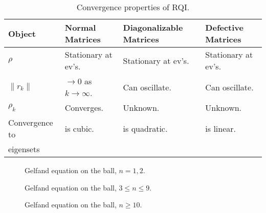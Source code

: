 \begin{table}[t]
\caption{Convergence properties of RQI.\label{pde.tab2}}
\centering
\plusline\small
\begin{tabular}{l|lll} \hline
Object & Normal Matrices & Diagonalizable Matrices
& Defective Matrices \\ \hline
$\rho$ & Stationary at ev's. &
Stationary at ev's. &
Stationary at ev's. \\
$\| r_k\|$ & $\to 0$ as $k\to\infty$. &
Can oscillate. &
Can oscillate. \\
$\rho_k$ & Converges. &
Unknown. &
Unknown. \\
Convergence to & is cubic. & is quadratic. & is linear. \\
eigensets & & & \\
\hline
\end{tabular}\normalsize
\end{table}

%
%
%
%
%
\begin{figure}[b]       %
\centering              %
\caption{Gelfand equation on the ball, $n=1,2$.
\label{gelfand.fig1}}    %
\end{figure}


\begin{figure}[p]       %
\centering
{}
\caption{Gelfand equation on the ball, $3\leq n \leq 9$.
\label{gelfand.fig2}}    %
\end{figure}

\begin{figure}[p] %
\centering
{}
\caption{Gelfand equation on the ball, $n\geq 10$.
\label{gelfand.fig3}}
\end{figure}
\clearpage %
